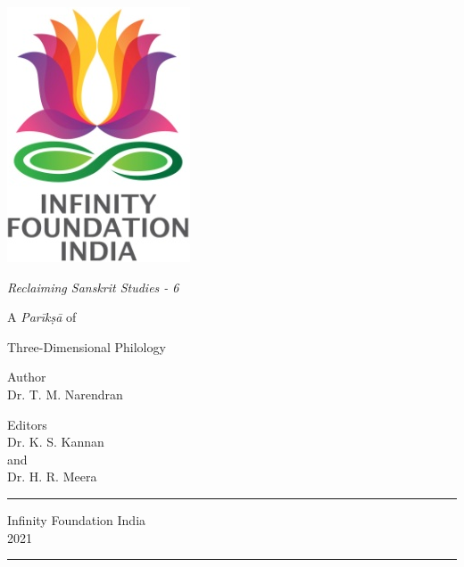 \thispagestyle{empty}
\begin{center}
\includegraphics[scale=0.3]{images/logo.png}
\bigskip

{\fontsize{10}{14}\selectfont\sl
Reclaiming Sanskrit Studies - 6
}

\bigskip
\end{center}
\medskip

\begin{center}
{{\fontsize{20}{24}\selectfont A \textit{Parīkṣā} of}}

{{\fontsize{20}{24}\selectfont Three-Dimensional Philology}}

\vfill


{\fontsize{14}{18}\selectfont 
Author\\[2pt]
Dr. T. M. Narendran}\par

\bigskip
\bigskip

{\fontsize{14}{18}\selectfont 
Editors\\[3pt]
Dr. K. S. Kannan\\
and\\[3pt]
Dr. H. R. Meera}\par
\vfill

\rule{5cm}{1pt}

{\fontsize{12}{14}\selectfont
Infinity Foundation India\\[4pt]
2021}

\rule{5cm}{1pt}
\end{center}





